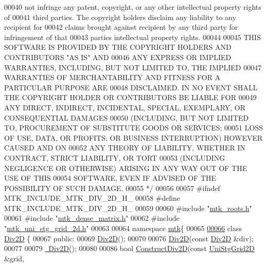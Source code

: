 \begin{DoxyCode}
00040 \textcolor{comment}{not infringe any patent, copyright, or any other intellectual property rights of}
00041 \textcolor{comment}{third parties. The copyright holders disclaim any liability to any recipient for}
00042 \textcolor{comment}{claims brought against recipient by any third party for infringement of that}
00043 \textcolor{comment}{parties intellectual property rights.}
00044 \textcolor{comment}{}
00045 \textcolor{comment}{THIS SOFTWARE IS PROVIDED BY THE COPYRIGHT HOLDERS AND CONTRIBUTORS "AS IS" AND}
00046 \textcolor{comment}{ANY EXPRESS OR IMPLIED WARRANTIES, INCLUDING, BUT NOT LIMITED TO, THE IMPLIED}
00047 \textcolor{comment}{WARRANTIES OF MERCHANTABILITY AND FITNESS FOR A PARTICULAR PURPOSE ARE}
00048 \textcolor{comment}{DISCLAIMED. IN NO EVENT SHALL THE COPYRIGHT HOLDER OR CONTRIBUTORS BE LIABLE FOR}
00049 \textcolor{comment}{ANY DIRECT, INDIRECT, INCIDENTAL, SPECIAL, EXEMPLARY, OR CONSEQUENTIAL DAMAGES}
00050 \textcolor{comment}{(INCLUDING, BUT NOT LIMITED TO, PROCUREMENT OF SUBSTITUTE GOODS OR SERVICES;}
00051 \textcolor{comment}{LOSS OF USE, DATA, OR PROFITS; OR BUSINESS INTERRUPTION) HOWEVER CAUSED AND ON}
00052 \textcolor{comment}{ANY THEORY OF LIABILITY, WHETHER IN CONTRACT, STRICT LIABILITY, OR TORT}
00053 \textcolor{comment}{(INCLUDING NEGLIGENCE OR OTHERWISE) ARISING IN ANY WAY OUT OF THE USE OF THIS}
00054 \textcolor{comment}{SOFTWARE, EVEN IF ADVISED OF THE POSSIBILITY OF SUCH DAMAGE.}
00055 \textcolor{comment}{*/}
00056 
00057 \textcolor{preprocessor}{#ifndef MTK\_INCLUDE\_MTK\_DIV\_2D\_H\_}
00058 \textcolor{preprocessor}{#define MTK\_INCLUDE\_MTK\_DIV\_2D\_H\_}
00059 
00060 \textcolor{preprocessor}{#include "\hyperlink{mtk__roots_8h}{mtk\_roots.h}"}
00061 \textcolor{preprocessor}{#include "\hyperlink{mtk__dense__matrix_8h}{mtk\_dense\_matrix.h}"}
00062 \textcolor{preprocessor}{#include "\hyperlink{mtk__uni__stg__grid__2d_8h}{mtk\_uni\_stg\_grid\_2d.h}"}
00063 
00064 \textcolor{keyword}{namespace }\hyperlink{namespacemtk}{mtk}\{
00065 
\hypertarget{mtk__div__2d_8h_source_l00066}{}\hyperlink{classmtk_1_1Div2D}{00066} \textcolor{keyword}{class }\hyperlink{classmtk_1_1Div2D}{Div2D} \{
00067  \textcolor{keyword}{public}:
00069   \hyperlink{classmtk_1_1Div2D_a124b888d5889538977e1a47d2fec78ff}{Div2D}();
00070 
00076   \hyperlink{classmtk_1_1Div2D_a124b888d5889538977e1a47d2fec78ff}{Div2D}(\textcolor{keyword}{const} \hyperlink{classmtk_1_1Div2D}{Div2D} &div);
00077 
00079   \hyperlink{classmtk_1_1Div2D_a5c10c0d7b974841e923ebe3fda67c468}{~Div2D}();
00080 
00086   \textcolor{keywordtype}{bool} \hyperlink{classmtk_1_1Div2D_a4214055909a6b94fcb9d657cc839055f}{ConstructDiv2D}(\textcolor{keyword}{const} \hyperlink{classmtk_1_1UniStgGrid2D}{UniStgGrid2D} &grid,

\end{DoxyCode}
